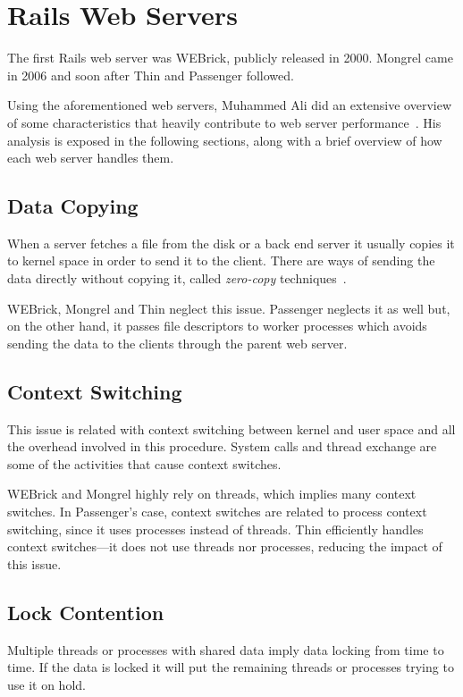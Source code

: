 \section{Rails Web Servers} %
\label{state:sec:rails_web_servers}
The first Rails web server was WEBrick, publicly released in 2000. Mongrel came in 2006 and soon after Thin and Passenger followed.

Using the aforementioned web servers, Muhammed Ali did an extensive overview of some characteristics that heavily contribute to web server performance~\cite{ruby_webservers}. His analysis is exposed in the following sections, along with a brief overview of how each web server handles them.

\subsection{Data Copying}
When a server fetches a file from the disk or a back end server it usually copies it to kernel space in order to send it to the client. There are ways of sending the data directly without copying it, called \textit{zero-copy} techniques~\cite{ zero-copy_data_transfer}.

WEBrick, Mongrel and Thin neglect this issue. Passenger neglects it as well but, on the other hand, it passes file descriptors to worker processes which avoids sending the data to the clients through the parent web server.

\subsection{Context Switching}
This issue is related with context switching between kernel and user space and all the overhead involved in this procedure. System calls and thread exchange are some of the activities that cause context switches.

WEBrick and Mongrel highly rely on threads, which implies many context switches. In Passenger's case, context switches are related to process context switching, since it uses processes instead of threads. Thin efficiently handles context switches---it does not use threads nor processes, reducing the impact of this issue.

\subsection{Lock Contention} 
Multiple threads or processes with shared data imply data locking from time to time. If the data is locked it will put the remaining threads or processes trying to use it on hold.

